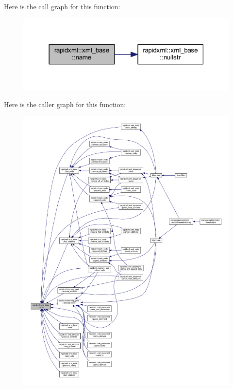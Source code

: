 Here is the call graph for this function\+:
\nopagebreak
\begin{figure}[H]
\begin{center}
\leavevmode
\includegraphics[width=318pt]{classrapidxml_1_1xml__base_a9a09739310469995db078ebd0da3ed45_cgraph}
\end{center}
\end{figure}




Here is the caller graph for this function\+:
\nopagebreak
\begin{figure}[H]
\begin{center}
\leavevmode
\includegraphics[width=350pt]{classrapidxml_1_1xml__base_a9a09739310469995db078ebd0da3ed45_icgraph}
\end{center}
\end{figure}


